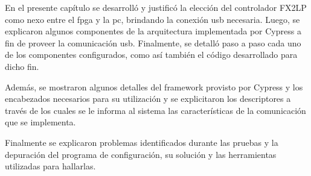 En el presente capítulo se desarrolló y justificó la elección del controlador FX2LP como nexo entre el \acrshort{fpga} y la \acrshort{pc}, brindando la conexión \acrshort{usb} necesaria. Luego, se explicaron algunos componentes de la arquitectura implementada por Cypress a fin de proveer la comunicación \acrshort{usb}. Finalmente, se detalló paso a paso cada uno de los componentes configurados, como así también el código desarrollado para dicho fin.

Además, se mostraron algunos detalles del framework provisto por Cypress y los encabezados necesarios para su utilización y se explicitaron los descriptores a través de los cuales se le informa al sistema las características de la comunicación que se implementa.

Finalmente se explicaron problemas identificados durante las pruebas y la depuración del programa de configuración, su solución y las herramientas utilizadas para hallarlas.